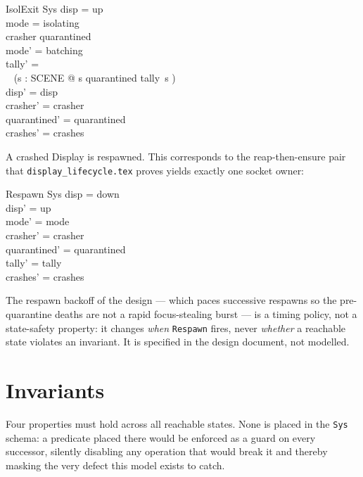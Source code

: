 \documentclass[a4paper,10pt,fleqn]{article}
\begin{document}
\begin{schema}{IsolExit}
  \Delta Sys
\where
  disp = up \\
  mode = isolating \\
  crasher \subseteq quarantined \\
  mode' = batching \\
  tally' = \\
  \quad~ (\lambda s : SCENE @ \IF s \in quarantined \THEN tally~s ) \\
  disp' = disp \\
  crasher' = crasher \\
  quarantined' = quarantined \\
  crashes' = crashes
\end{schema}

A crashed Display is respawned.  This corresponds to the reap-then-ensure pair
that \texttt{display\_lifecycle.tex} proves yields exactly one socket owner:

\begin{schema}{Respawn}
  \Delta Sys
\where
  disp = down \\
  disp' = up \\
  mode' = mode \\
  crasher' = crasher \\
  quarantined' = quarantined \\
  tally' = tally \\
  crashes' = crashes
\end{schema}

The respawn backoff of the design --- which paces successive respawns so the
pre-quarantine deaths are not a rapid focus-stealing burst --- is a timing
policy, not a state-safety property: it changes \emph{when} \texttt{Respawn}
fires, never \emph{whether} a reachable state violates an invariant.  It is
specified in the design document, not modelled.

\section{Invariants}
\label{sec:inv}

Four properties must hold across all reachable states.  None is placed in the
\texttt{Sys} schema: a predicate placed there would be enforced as a guard on
every successor, silently disabling any operation that would break it and thereby
masking the very defect this model exists to catch.
\end{document}
